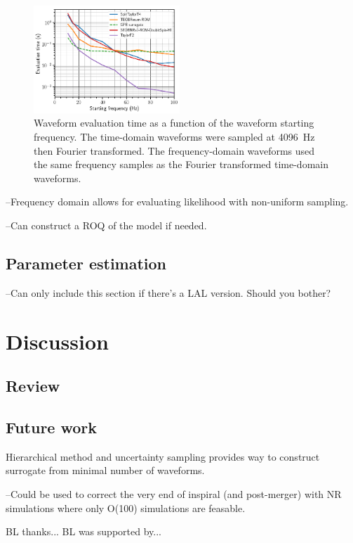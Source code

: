 \documentclass[prd,aps,letter,twocolumn,floatfix,notitlepage]{revtex4-1}
\begin{document}
\begin{figure}[htb]
\centering
\includegraphics[width=0.49\textwidth]{timing.png}
\caption{Waveform evaluation time as a function of the waveform starting frequency. The time-domain waveforms
were sampled at 4096~Hz then Fourier transformed. The frequency-domain waveforms used the
same frequency samples as the Fourier transformed time-domain waveforms.}
\label{fig:timing}
\end{figure}

--Frequency domain allows for evaluating likelihood with non-uniform sampling.

--Can construct a ROQ of the model if needed.

\subsection{Parameter estimation}

--Can only include this section if there's a LAL version. Should you bother?


\section{Discussion}

\subsection{Review}



\subsection{Future work}

Hierarchical method and uncertainty sampling provides way to construct surrogate from minimal number of waveforms.

--Could be used to correct the very end of inspiral (and post-merger) with NR simulations where only O(100) simulations are feasable.


\begin{acknowledgments}

BL thanks... BL was supported by... 

\end{acknowledgments}


%     
  
\end{document}
